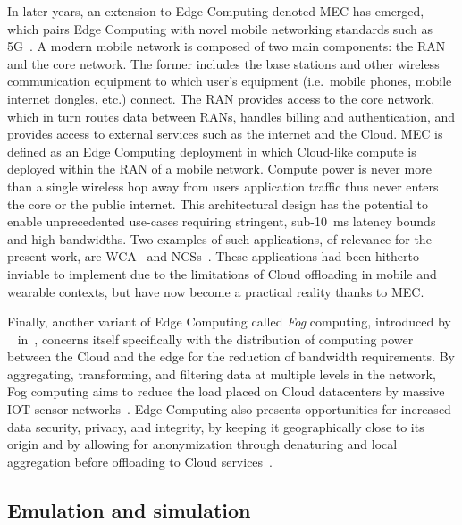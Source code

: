 %
%
In later years, an extension to Edge Computing denoted \gls{MEC} has emerged, which pairs Edge Computing with novel mobile networking standards such as 5G~\cite{hassan2019edge,pham2020survey,wan2020efficient}.
A modern mobile network is composed of two main components: the \gls{RAN} and the core network.
The former includes the base stations and other wireless communication equipment to which user's equipment (i.e.\ mobile phones, mobile internet dongles, etc.) connect. 
The \gls{RAN} provides access to the core network, which in turn routes data between \glspl{RAN}, handles billing and authentication, and provides access to external services such as the internet and the Cloud.
\gls{MEC} is defined as an Edge Computing deployment in which Cloud-like compute is deployed within the \gls{RAN} of a mobile network.
Compute power is never more than a single wireless hop away from users application traffic thus never enters the core or the public internet.
This architectural design has the potential to enable unprecedented use-cases requiring stringent, sub-\SI{10}{\milli\second} latency bounds and high bandwidths.
Two examples of such applications, of relevance for the present work, are \acl{WCA}~\cite{ha2014towards,chen2018application,wang2020scaling,chen2017empirical,chen2018application} and \aclp{NCS}~\cite{sasaki2016vehicle,wang2018bandwidth,wan2020efficient}.
These applications had been hitherto inviable to implement due to the limitations of Cloud offloading in mobile and wearable contexts, but have now become a practical reality thanks to \gls{MEC}.

Finally, another variant of Edge Computing called \emph{Fog} computing, introduced by \citeauthor{bonomi2012fog}~\cite{bonomi2012fog} in\ \citeyear{bonomi2012fog}, concerns itself specifically with the distribution of computing power between the Cloud and the edge for the reduction of bandwidth requirements.
By aggregating, transforming, and filtering data at multiple levels in the network, Fog computing aims to reduce the load placed on Cloud datacenters by massive \gls{IOT} sensor networks~\cite{yi2015survey}.
Edge Computing also presents opportunities for increased data security, privacy, and integrity, by keeping it geographically close to its origin and by allowing for anonymization through denaturing and local aggregation before offloading to Cloud services~\cite{satyanarayanan2017emergence}.

\subsection{Emulation and simulation}


